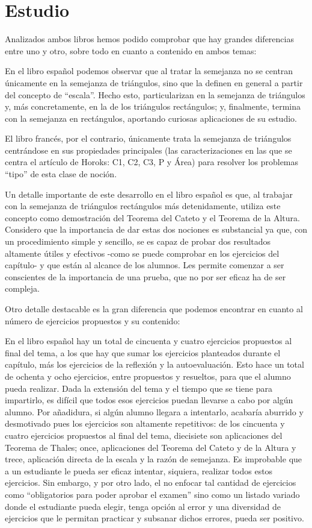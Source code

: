 \section{Estudio}
	
	Analizados ambos libros hemos podido comprobar que hay grandes diferencias entre uno y otro, sobre todo en cuanto a contenido en ambos temas:
	
	En el libro español podemos observar que al tratar la semejanza no se centran únicamente en la semejanza de triángulos, sino que la definen en general a partir del concepto de ``escala''. Hecho esto, particularizan en la semejanza de triángulos y, más concretamente, en la de los triángulos rectángulos; y, finalmente, termina con la semejanza en rectángulos, aportando curiosas aplicaciones de su estudio. 
	
	El libro francés, por el contrario, únicamente trata la semejanza de triángulos centrándose en sus propiedades principales (las caracterizaciones en las que se centra el artículo de Horoks: C1, C2, C3, P y Área) para resolver los problemas ``tipo'' de esta clase de noción.
	
	Un detalle importante de este desarrollo en el libro español es que, al trabajar con la semejanza de triángulos rectángulos más detenidamente, utiliza este concepto como demostración del Teorema del Cateto y el Teorema de la Altura. Considero que la importancia de dar estas dos nociones es substancial ya que, con un procedimiento simple y sencillo, se es capaz de probar dos resultados altamente útiles y efectivos -como se puede comprobar en los ejercicios del capítulo- y que están al alcance de los alumnos. Les permite comenzar a ser conscientes de la importancia de una prueba, que no por ser eficaz ha de ser compleja.
	
	Otro detalle destacable es la gran diferencia que podemos encontrar en cuanto al número de ejercicios propuestos y su contenido:
	
	En el libro español hay un total de cincuenta y cuatro ejercicios propuestos al final del tema, a los que hay que sumar los ejercicios planteados durante el capítulo, más los ejercicios de la reflexión y la autoevaluación. Esto hace un total de ochenta y ocho ejercicios, entre propuestos y resueltos, para que el alumno pueda realizar. Dada la extensión del tema y el tiempo que se tiene para impartirlo, es difícil que todos esos ejercicios puedan llevarse a cabo por algún alumno. Por añadidura, si algún alumno llegara a intentarlo, acabaría aburrido y desmotivado pues los ejercicios son altamente repetitivos: de los cincuenta y cuatro ejercicios propuestos al final del tema, diecisiete son aplicaciones del Teorema de Thales; once, aplicaciones del Teorema del Cateto y de la Altura y trece, aplicación directa de la escala y la razón de semejanza. Es improbable que a un estudiante le pueda ser eficaz intentar, siquiera, realizar todos estos ejercicios. Sin embargo, y por otro lado, el no enfocar tal cantidad de ejercicios como ``obligatorios para poder aprobar el examen'' sino como un listado variado donde el estudiante pueda elegir, tenga opción al error y una diversidad de ejercicios que le permitan practicar y subsanar dichos errores, pueda ser positivo.
	
